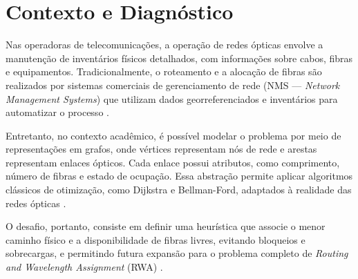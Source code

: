 \section{Contexto e Diagnóstico} \label{sec:context}

Nas operadoras de telecomunicações, a operação de redes ópticas envolve a
manutenção de inventários físicos detalhados, com informações sobre cabos,
fibras e equipamentos. Tradicionalmente, o roteamento e a alocação de fibras
são realizados por sistemas comerciais de gerenciamento de rede (NMS —
\textit{Network Management Systems}) que utilizam dados georreferenciados e
inventários para automatizar o processo \cite{livroprofessor}.

Entretanto, no contexto acadêmico, é possível modelar o problema por meio de
representações em grafos, onde vértices representam nós de rede e arestas
representam enlaces ópticos. Cada enlace possui atributos, como comprimento,
número de fibras e estado de ocupação. Essa abstração permite aplicar
algoritmos clássicos de otimização, como Dijkstra e Bellman-Ford, adaptados à
realidade das redes ópticas \cite{bazaraa2011linear}.

O desafio, portanto, consiste em definir uma heurística que associe o menor
caminho físico e a disponibilidade de fibras livres, evitando bloqueios e
sobrecargas, e permitindo futura expansão para o problema completo de
\textit{Routing and Wavelength Assignment} (RWA) \cite{artigorwa}.
